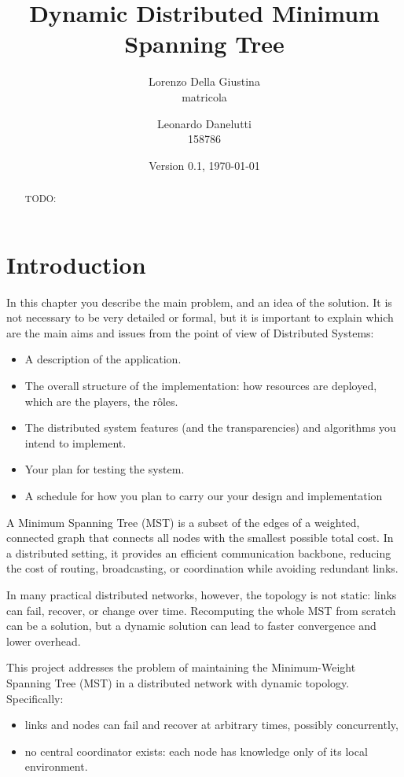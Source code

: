 \documentclass{memoir}
\title{Dynamic Distributed Minimum Spanning Tree}
\author{Lorenzo Della Giustina\\ matricola
\and Leonardo Danelutti\\ 158786}
\date{Version 0.1, \today}
\begin{document}
\maketitle
\begin{abstract}
	TODO:
\end{abstract}

\chapter{Introduction}\label{ch:intro}

In this chapter you describe the main problem, and an idea of the solution.
It is not necessary to be very detailed or formal, but it is important to explain which are the main aims and issues from the point of view of Distributed Systems:
\begin{itemize}
\item A description of the application.
\item The overall structure of the implementation: how resources are deployed, which are the players, the r\^oles.
\item The distributed system features (and the transparencies) and algorithms you intend to implement.
\item Your plan for testing the system.
\item A schedule for how you plan to carry our your design and implementation
\end{itemize}

A Minimum Spanning Tree (MST) is a subset of the edges of a weighted, connected graph that connects all nodes with the smallest possible total cost. In a distributed setting, it provides an efficient communication backbone, reducing the cost of routing, broadcasting, or coordination while avoiding redundant links.

In many practical distributed networks, however, the topology is not static: links can fail, recover, or change over time. Recomputing the whole MST from scratch can be a solution, but a dynamic solution can lead to faster convergence and lower overhead.

This project addresses the problem of maintaining the Minimum-Weight Spanning Tree (MST) in a distributed network with dynamic topology. Specifically:

\begin{itemize}
\item links and nodes can fail and recover at arbitrary times, possibly concurrently,
\item no central coordinator exists: each node has knowledge only of its local
environment.
\end{itemize}
\end{document}
